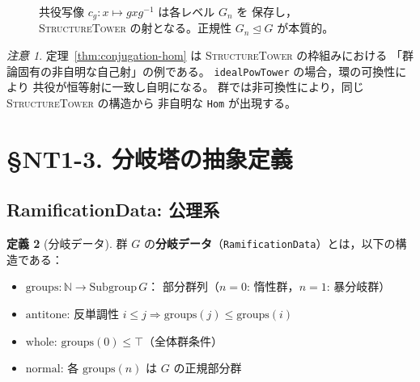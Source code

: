 \documentclass[a4paper,11pt]{ltjsarticle}
\theoremstyle{definition}
\newtheorem{definition}{定義}[section]
\theoremstyle{plain}
\theoremstyle{remark}
\newtheorem{remark}[definition]{注意}
\begin{document}
\begin{figure}[H]
\centering
{}
\caption{共役写像 $c_g\colon x \mapsto gxg^{-1}$ は各レベル $G_n$ を
保存し，\textsc{StructureTower} の射となる。正規性 $G_n \trianglelefteq G$ が本質的。}
\label{fig:conjugation-hom}
\end{figure}

\begin{remark}
定理~\ref{thm:conjugation-hom} は \textsc{StructureTower} の枠組みにおける
「群論固有の非自明な自己射」の例である。
\texttt{idealPowTower} の場合，環の可換性により
共役が恒等射に一致し自明になる。
群では非可換性により，同じ \textsc{StructureTower} の構造から
非自明な \texttt{Hom} が出現する。
\end{remark}

\section{§NT1-3. 分岐塔の抽象定義}\label{sec:ramification}

\subsection{RamificationData: 公理系}

\begin{definition}[分岐データ]\label{def:ramification-data}
  群 $G$ の\textbf{分岐データ}（\texttt{RamificationData}）とは，以下の構造である：
  \begin{itemize}
    \item $\mathrm{groups}\colon \mathbb{N} \to \mathrm{Subgroup}\,G$：
      部分群列（$n=0$: 惰性群，$n=1$: 暴分岐群）
    \item $\mathrm{antitone}$: 反単調性 $i \leq j \Rightarrow \mathrm{groups}(j) \leq \mathrm{groups}(i)$
    \item $\mathrm{whole}$: $\mathrm{groups}(0) \leq \top$（全体群条件）
    \item $\mathrm{normal}$: 各 $\mathrm{groups}(n)$ は $G$ の正規部分群
  \end{itemize}
\end{definition}
\end{document}
